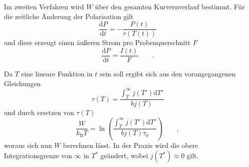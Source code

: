 Im zweiten Verfahren wird $W$ über den gesamten Kurvernverlauf bestimmt.
Für die zeitliche Änderung der Polarisation gilt
\begin{equation*}
    \frac{\mathrm{d}P}{\mathrm{d}t} = - \frac{ P(t) }{ \tau(T(t))}
\end{equation*}
und diese erzeugt einen äußeren Strom pro Probenquerschnitt $F$
\begin{equation*}
    \frac{\mathrm{d}P}{\mathrm{d}t} = \frac{I(t)}{F} \qquad.
\end{equation*}

Da $T$ eine lineare Funktion in $t$ sein soll ergibt sich aus den vorangegangenen Gleichungen
\begin{equation*}
    \tau(T) = \frac{ \int_{T}^\infty j(T') \mathrm{d}T' }{ b j(T) } 
\end{equation*}
und durch ersetzen von $\tau(T)$ 
\begin{equation}
    \label{eqn:integrate}
     \frac{ W }{ k_\mathrm{B} T } = \ln{ \left( \frac{ \int_{T}^\infty j(T') \mathrm{d}T' }{ b j(T) \tau_0 } \right) } \qquad ,
\end{equation}
woraus sich nun $W$ berechnen lässt.
In der Praxis wird die obere Integrationsgrenze von $\infty$ in $T^*$ geändert, wobei $j(T^*) \approx 0$ gilt.

